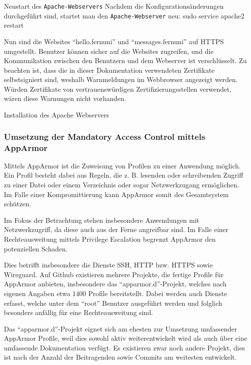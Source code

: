 Neustart des \verb+Apache-Webservers+
Nachdem die Konfigurationsänderungen durchgeführt sind, startet man den \verb+Apache-Webserver+ neu:
sudo service apache2 restart

Nun sind die Websites \enquote{hello.fernuni} und \enquote{messages.fernuni} auf HTTPS umgestellt. Benutzer können sicher auf die Websites zugreifen, und die Kommunikation zwischen den Benutzern und dem Webserver ist verschlüsselt.
Zu beachten ist, dass die in dieser Dokumentation verwendeten Zertifikate selbstsigniert sind, weshalb Warnmeldungen im Webbrowser angezeigt werden. Würden Zertifikate von vertrauenswürdigen Zertifizierungsstellen verwendet, wären diese Warnungen nicht vorhanden.

\begin{listing}[ht]{}
    \caption{Installation des Apache Webservers}
    \label{listing:installation_apache}
\end{listing}

\subsubsection{Umsetzung der Mandatory Access Control mittels AppArmor}

Mittels AppArmor ist die Zuweisung von Profilen zu einer Anwendung möglich. Ein Profil besteht dabei aus Regeln, die z. B. lesenden oder schreibenden Zugriff zu einer Datei oder einem Verzeichnis oder sogar Netzwerkzugang ermöglichen. Im Falle einer Kompromittierung kann AppArmor somit des Gesamtsystem schützen.

Im Fokus der Betrachtung stehen insbesondere Anwendungen mit Netzwerkzugriff, da diese auch aus der Ferne angreifbar sind. Im Falle einer Rechteausweitung mittels Privilege Escalation begrenzt AppArmor den potenziellen Schaden\cite{hutchinsIntelligenceDrivenComputerNetwork}.

Dies betrifft insbesondere die Dienste \ac{SSH}, \ac{HTTP} bzw. \ac{HTTPS} sowie Wireguard. Auf Github existieren mehrere Projekte, die fertige Profile für AppArmor anbieten, insbesondere das \enquote{apparmor.d}-Projekt, welches nach eigenen Angaben etwa 1400 Profile bereitstellt. Dabei werden auch Dienste erfasst, welche unter dem \enquote{root} Benutzer ausgeführt werden und folglich besonders anfällig für eine Rechteausweitung sind.

Das \enquote{apparmor.d}-Projekt eignet sich am ehesten zur Umsetzung umfassender AppArmor Profile, weil dies sowohl aktiv weiterentwickelt wird als auch über eine umfassende Dokumentation verfügt. Es existieren zwar noch andere Projekt, dies ist nach der Anzahl der Beitragenden sowie Commits am weitesten entwickelt.

